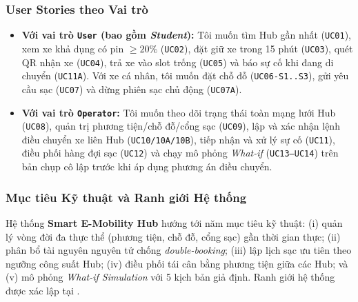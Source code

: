 \subsubsection*{User Stories theo Vai trò}
\begin{itemize}[leftmargin=*,nosep]
    \item \textbf{Với vai trò \texttt{User} (bao gồm \textit{Student}):} Tôi muốn tìm Hub gần nhất (\texttt{UC01}), xem xe khả dụng có pin $\ge 20\%$ (\texttt{UC02}), đặt giữ xe trong 15 phút (\texttt{UC03}), quét QR nhận xe (\texttt{UC04}), trả xe vào slot trống (\texttt{UC05}) và báo sự cố khi đang di chuyển (\texttt{UC11A}). Với xe cá nhân, tôi muốn đặt chỗ đỗ (\texttt{UC06-S1..S3}), gửi yêu cầu sạc (\texttt{UC07}) và dừng phiên sạc chủ động (\texttt{UC07A}).
    \item \textbf{Với vai trò \texttt{Operator}:} Tôi muốn theo dõi trạng thái toàn mạng lưới Hub (\texttt{UC08}), quản trị phương tiện/chỗ đỗ/cổng sạc (\texttt{UC09}), lập và xác nhận lệnh điều chuyển xe liên Hub (\texttt{UC10/10A/10B}), tiếp nhận và xử lý sự cố (\texttt{UC11}), điều phối hàng đợi sạc (\texttt{UC12}) và chạy mô phỏng \textit{What-if} (\texttt{UC13--UC14}) trên bản chụp cô lập trước khi áp dụng phương án điều chuyển.
\end{itemize}

\subsubsection*{Mục tiêu Kỹ thuật và Ranh giới Hệ thống}
Hệ thống \textbf{Smart E-Mobility Hub} hướng tới năm mục tiêu kỹ thuật: (i) quản lý vòng đời đa thực thể (phương tiện, chỗ đỗ, cổng sạc) gần thời gian thực; (ii) phân bổ tài nguyên nguyên tử chống \textit{double-booking}; (iii) lập lịch sạc ưu tiên theo ngưỡng công suất Hub; (iv) điều phối tái cân bằng phương tiện giữa các Hub; và (v) mô phỏng \textit{What-if Simulation} với 5 kịch bản giả định. Ranh giới hệ thống được xác lập tại .

